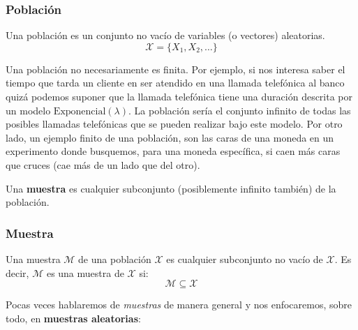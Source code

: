 \documentclass[
]{book}
\newenvironment{Definicion}
{\begin{mdframed}[
  linecolor=definicioncolor,
  skipabove=12pt,
  skipbelow=12pt,
  roundcorner=20pt,
  splittopskip=2\topsep]}
{\end{mdframed}}
\begin{document}
\begin{Definicion}
\hypertarget{poblaciuxf3n}{%
\subsubsection{Población}\label{poblaciuxf3n}}

Una población es un conjunto no vacío de variables (o vectores)
aleatorias. \[
\mathcal{X} = \{ X_1, X_2, \dots \}
\]
\end{Definicion}

Una población no necesariamente es finita. Por ejemplo, si nos interesa saber el tiempo que tarda un cliente en ser atendido en una llamada telefónica al banco quizá podemos suponer que la llamada telefónica tiene una duración descrita por un modelo \(\text{Exponencial}(\lambda)\). La población sería el conjunto infinito de todas las posibles llamadas telefónicas que se pueden realizar bajo este modelo. Por otro lado, un ejemplo finito de una población, son las caras de una moneda en un experimento donde busquemos, para una moneda específica, si caen más caras que cruces (cae más de un lado que del otro).

Una \textbf{muestra} es cualquier subconjunto (posiblemente infinito también) de la población.

\begin{Definicion}
\hypertarget{muestra}{%
\subsubsection{Muestra}\label{muestra}}

Una muestra \(\mathcal{M}\) de una población \(\mathcal{X}\) es
cualquier subconjunto no vacío de \(\mathcal{X}\). Es decir,
\(\mathcal{M}\) es una muestra de \(\mathcal{X}\) si: \[
 \mathcal{M} \subseteq \mathcal{X}
\]
\end{Definicion}

Pocas veces hablaremos de \emph{muestras} de manera general y nos enfocaremos, sobre todo, en \textbf{muestras aleatorias}:
\end{document}
